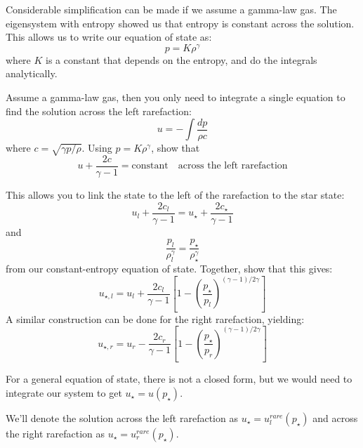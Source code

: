 Considerable simplification can be made if we assume a gamma-law gas.
The eigensystem with entropy showed us that entropy is constant across
the solution.  This allows us to write our equation of state as:
\begin{equation}
p = K \rho^\gamma
\end{equation}
where $K$ is a constant that depends on the entropy, and do the 
integrals analytically.

\begin{exercise}
Assume a gamma-law gas, then you only need to integrate a single
equation to find the solution across the left rarefaction:
\begin{equation}
u = - \int \frac{dp}{\rho c}
\end{equation}
where $c = \sqrt{\gamma p/\rho}$.  Using $p = K\rho^\gamma$, show that
\begin{equation}
u + \frac{2c}{\gamma - 1} = \mbox{constant} \quad \mbox{across the left rarefaction}
\end{equation}

This allows you to link the state to the left of the rarefaction to the star state:
\begin{equation}
u_l + \frac{2c_l}{\gamma - 1} = u_\star + \frac{2c_\star}{\gamma -1}
\end{equation}
and
\begin{equation}
\frac{p_l}{\rho_l^\gamma} = \frac{p_\star}{\rho_\star^\gamma}
\end{equation}
from our constant-entropy equation of state.  Together, show that this
gives:
\begin{equation}
u_{\star,l} = u_l + \frac{2c_l}{\gamma - 1} \left [ 1 - \left ( \frac{p_\star}{p_l}\right )^{(\gamma - 1)/2\gamma} \right ]
\end{equation}
A similar construction can be done for the right rarefaction, yielding:
\begin{equation}
u_{\star,r} = u_r - \frac{2c_r}{\gamma - 1} \left [ 1 - \left ( \frac{p_\star}{p_r}\right )^{(\gamma - 1)/2\gamma} \right ]
\end{equation}

\end{exercise}

For a general equation of state, there is not a closed form, but we would need
to integrate our system to get $u_\star = u(p_\star)$.

We'll denote the solution across the left rarefaction as $u_\star =
u_l^{rare}(p_\star)$ and across the right rarefaction as $u_\star =
u_r^{rare}(p_\star)$.

